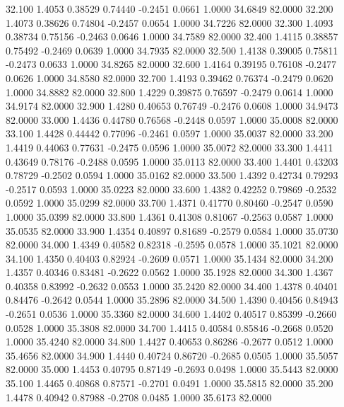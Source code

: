  32.100   1.4053   0.38529   0.74440  -0.2451   0.0661   1.0000  34.6849  82.0000
  32.200   1.4073   0.38626   0.74804  -0.2457   0.0654   1.0000  34.7226  82.0000
  32.300   1.4093   0.38734   0.75156  -0.2463   0.0646   1.0000  34.7589  82.0000
  32.400   1.4115   0.38857   0.75492  -0.2469   0.0639   1.0000  34.7935  82.0000
  32.500   1.4138   0.39005   0.75811  -0.2473   0.0633   1.0000  34.8265  82.0000
  32.600   1.4164   0.39195   0.76108  -0.2477   0.0626   1.0000  34.8580  82.0000
  32.700   1.4193   0.39462   0.76374  -0.2479   0.0620   1.0000  34.8882  82.0000
  32.800   1.4229   0.39875   0.76597  -0.2479   0.0614   1.0000  34.9174  82.0000
  32.900   1.4280   0.40653   0.76749  -0.2476   0.0608   1.0000  34.9473  82.0000
  33.000   1.4436   0.44780   0.76568  -0.2448   0.0597   1.0000  35.0008  82.0000
  33.100   1.4428   0.44442   0.77096  -0.2461   0.0597   1.0000  35.0037  82.0000
  33.200   1.4419   0.44063   0.77631  -0.2475   0.0596   1.0000  35.0072  82.0000
  33.300   1.4411   0.43649   0.78176  -0.2488   0.0595   1.0000  35.0113  82.0000
  33.400   1.4401   0.43203   0.78729  -0.2502   0.0594   1.0000  35.0162  82.0000
  33.500   1.4392   0.42734   0.79293  -0.2517   0.0593   1.0000  35.0223  82.0000
  33.600   1.4382   0.42252   0.79869  -0.2532   0.0592   1.0000  35.0299  82.0000
  33.700   1.4371   0.41770   0.80460  -0.2547   0.0590   1.0000  35.0399  82.0000
  33.800   1.4361   0.41308   0.81067  -0.2563   0.0587   1.0000  35.0535  82.0000
  33.900   1.4354   0.40897   0.81689  -0.2579   0.0584   1.0000  35.0730  82.0000
  34.000   1.4349   0.40582   0.82318  -0.2595   0.0578   1.0000  35.1021  82.0000
  34.100   1.4350   0.40403   0.82924  -0.2609   0.0571   1.0000  35.1434  82.0000
  34.200   1.4357   0.40346   0.83481  -0.2622   0.0562   1.0000  35.1928  82.0000
  34.300   1.4367   0.40358   0.83992  -0.2632   0.0553   1.0000  35.2420  82.0000
  34.400   1.4378   0.40401   0.84476  -0.2642   0.0544   1.0000  35.2896  82.0000
  34.500   1.4390   0.40456   0.84943  -0.2651   0.0536   1.0000  35.3360  82.0000
  34.600   1.4402   0.40517   0.85399  -0.2660   0.0528   1.0000  35.3808  82.0000
  34.700   1.4415   0.40584   0.85846  -0.2668   0.0520   1.0000  35.4240  82.0000
  34.800   1.4427   0.40653   0.86286  -0.2677   0.0512   1.0000  35.4656  82.0000
  34.900   1.4440   0.40724   0.86720  -0.2685   0.0505   1.0000  35.5057  82.0000
  35.000   1.4453   0.40795   0.87149  -0.2693   0.0498   1.0000  35.5443  82.0000
  35.100   1.4465   0.40868   0.87571  -0.2701   0.0491   1.0000  35.5815  82.0000
  35.200   1.4478   0.40942   0.87988  -0.2708   0.0485   1.0000  35.6173  82.0000
